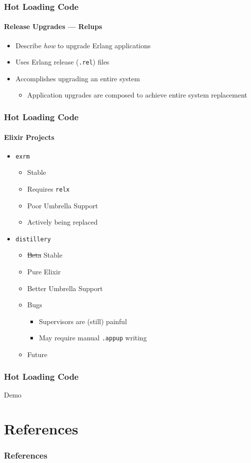 \documentclass{beamer}
\begin{document}
\begin{frame}
\frametitle{Hot Loading Code}
\framesubtitle{Release Upgrades --- Relups}
\begin{itemize}
\item{Describe \textit{how} to upgrade Erlang applications}
\item{Uses Erlang release (\texttt{.rel}) files}
\item{Accomplishes upgrading an entire system}
\begin{itemize}
\item{Application upgrades are composed to achieve entire system replacement}
\end{itemize}
\end{itemize}
\end{frame}

\begin{frame}
\frametitle{Hot Loading Code}
\framesubtitle{Elixir Projects}
\begin{itemize}
\item{\texttt{exrm}~\cite{website:bitwalker/exrm}}
\begin{itemize}
\item{Stable}
\item{Requires \texttt{relx}~\cite{website:erlware/relx}}
\item{Poor Umbrella Support}
\item{Actively being replaced}
\end{itemize}
\item{\texttt{distillery}~\cite{website:bitwalker/distillery}}
\begin{itemize}
\item{\sout{Beta} Stable}
\item{Pure Elixir}
\item{Better Umbrella Support}
\item{Bugs}
\begin{itemize}
\item{Supervisors are (still) painful}
\item{May require manual \texttt{.appup} writing}
\end{itemize}
\item{Future}
\end{itemize}
\end{itemize}
\end{frame}

\begin{frame}
\frametitle{Hot Loading Code}
\Huge{Demo}
\end{frame}

\section*{References}
\begin{frame}[allowframebreaks]
\frametitle{References}
\nocite{*}
\renewcommand{\refname}{}


\end{frame}

\end{document}
